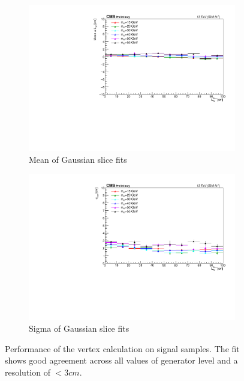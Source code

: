 \begin{figure}[htb!]
\begin{subfigure}[h]{0.45\linewidth}
		\centering
		\includegraphics[width=\linewidth]{figs/05_analysis/2018_meanLxyVsLxy_Z_all.pdf}
		\caption{Mean of Gaussian slice fits}
		\label{fig:lxys_c}
	\end{subfigure}
	\begin{subfigure}[h]{0.45\linewidth}
		\centering
		\includegraphics[width=\linewidth]{figs/05_analysis/2018_sigmaLxyVsLxy_Z_all.pdf}
		\caption{Sigma of Gaussian slice fits}
		\label{fig:lxys_d}
	\end{subfigure}
	\caption[Performance of the vertex calculation on signal samples. The fit shows good agreement across all values of generator level \lxy and a resolution of $<3\unit{cm}$.]{Performance of the vertex calculation on signal samples. The fit shows good agreement across all values of generator level \lxy and a resolution of $<3\unit{cm}$.}
	\label{fig:lxys}
\end{figure}

